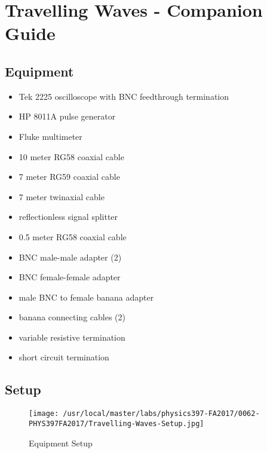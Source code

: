 \AtEndDocument{\clearpage\ifodd\value{page}\else\null\clearpage\fi} %

%
%


\chapter{Travelling Waves - Companion Guide}

\section{Equipment}

\begin{minipage}[t]{0.5\textwidth}
\begin{itemize}[noitemsep]
\item Tek 2225 oscilloscope with BNC feedthrough termination
\item HP 8011A pulse generator
\item Fluke multimeter
\item 10 meter RG58 coaxial cable
\item 7 meter RG59 coaxial cable
\item 7 meter twinaxial cable
\item reflectionless signal splitter
\end{itemize}
\end{minipage}
\begin{minipage}[t]{0.5\textwidth}
\begin{itemize}[noitemsep]
\item 0.5 meter RG58 coaxial cable
\item BNC male-male adapter (2)
\item BNC female-female adapter
\item male BNC to female banana adapter
\item banana connecting cables (2)
\item variable resistive termination
\item short circuit termination
\end{itemize}
\end{minipage}

\section{Setup}
\begin{figure}
\texttt{[image: /usr/local/master/labs/physics397-FA2017/0062-PHYS397FA2017/Travelling-Waves-Setup.jpg]}
\caption{Equipment Setup}
\label{pic:TWsetup}
\end{figure}

